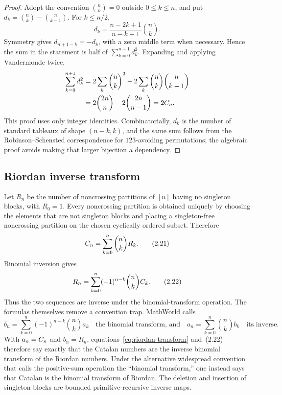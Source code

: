\begin{proof}
Adopt the convention $\binom nk=0$ outside $0\le k\le n$, and put
$d_k=\binom nk-\binom n{k-1}$.  For $k\le n/2$,
\[
 d_k=\frac{n-2k+1}{n-k+1}\binom nk.
\]
Symmetry gives $d_{n+1-k}=-d_k$, with a zero middle term when necessary.
Hence the sum in the statement is half of $\sum_{k=0}^{n+1}d_k^2$.  Expanding
and applying Vandermonde twice,
\begin{align*}
 \sum_{k=0}^{n+1}d_k^2
 &=2\sum_k\binom nk^2-2\sum_k\binom nk\binom n{k-1}\\
 &=2\binom{2n}{n}-2\binom{2n}{n-1}=2C_n.
\end{align*}
This proof uses only integer identities.  Combinatorially, $d_k$ is the number
of standard tableaux of shape $(n-k,k)$, and the same sum follows from the
Robinson--Schensted correspondence for $123$-avoiding permutations; the
algebraic proof avoids making that larger bijection a dependency.
\end{proof}

\subsection{Riordan inverse transform}

Let $R_n$ be the number of noncrossing partitions of $[n]$ having no singleton
blocks, with $R_0=1$.  Every noncrossing partition is obtained uniquely by
choosing the elements that are not singleton blocks and placing a
singleton-free noncrossing partition on the chosen cyclically ordered subset.
Therefore
\[
 C_n=\sum_{k=0}^{n}\binom nk R_k.                              \tag{2.21}\label{eq:riordan-transform}
\]
Binomial inversion gives
\[
 R_n=\sum_{k=0}^{n}(-1)^{n-k}\binom nkC_k.                    \tag{2.22}
\]
Thus the two sequences are inverse under the binomial-transform operation.
The formulas themselves remove a convention trap.  MathWorld calls
\[
 b_n=\sum_{k=0}^n(-1)^{n-k}\binom nk a_k
 \quad\text{the binomial transform, and}\quad
 a_n=\sum_{k=0}^n\binom nk b_k
 \quad\text{its inverse}.
\]
With $a_n=C_n$ and $b_n=R_n$, equations~\eqref{eq:riordan-transform}
and~(2.22) therefore say exactly that the Catalan numbers are the inverse
binomial transform of the Riordan numbers.  Under the alternative widespread
convention that calls the positive-sum operation the ``binomial transform,''
one instead says that Catalan is the binomial transform of Riordan.  The
deletion and insertion of singleton blocks are bounded primitive-recursive
inverse maps.
